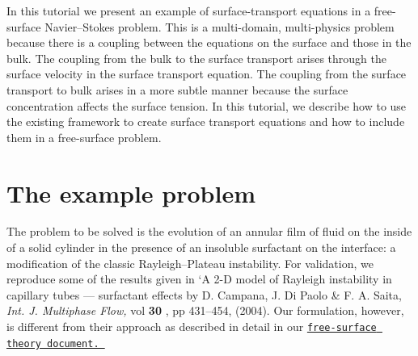 In this tutorial we present an example of surface-\/transport equations in a free-\/surface Navier--Stokes problem. This is a multi-\/domain, multi-\/physics problem because there is a coupling between the equations on the surface and those in the bulk. The coupling from the bulk to the surface transport arises through the surface velocity in the surface transport equation. The coupling from the surface transport to bulk arises in a more subtle manner because the surface concentration affects the surface tension. In this tutorial, we describe how to use the existing framework to create surface transport equations and how to include them in a free-\/surface problem.



 

\hypertarget{index_example_problem}{}\section{The example problem}\label{index_example_problem}
The problem to be solved is the evolution of an annular film of fluid on the inside of a solid cylinder in the presence of an insoluble surfactant on the interface\+: a modification of the classic Rayleigh--Plateau instability. For validation, we reproduce some of the results given in `A 2-\/D model of Rayleigh instability in capillary tubes --- surfactant effects\textquotesingle{} by D. Campana, J. Di Paolo \& F. A. Saita, {\itshape  Int. J. Multiphase Flow, } vol {\bfseries  30 }, pp 431--454, (2004). Our formulation, however, is different from their approach as described in detail in our \href{../../../navier_stokes/surface_theory/html/index.html}{\tt free-\/surface theory document. }

